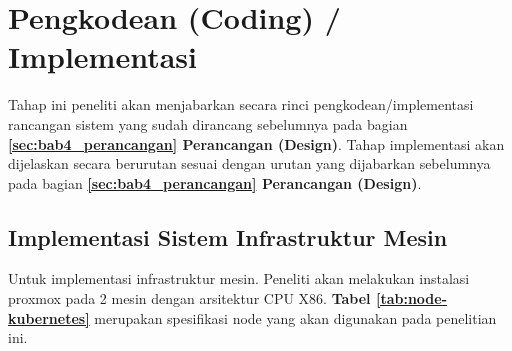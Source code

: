 \section{Pengkodean (Coding) / Implementasi}\label{sec:bab4_implementasi}
Tahap ini peneliti akan menjabarkan secara rinci pengkodean/implementasi
rancangan sistem yang sudah dirancang sebelumnya pada bagian
\textbf{\ref{sec:bab4_perancangan} Perancangan (Design)}. Tahap implementasi
akan dijelaskan secara berurutan sesuai dengan urutan yang dijabarkan
sebelumnya pada bagian \textbf{\ref{sec:bab4_perancangan} Perancangan
  (Design)}.

\subsection{Implementasi Sistem Infrastruktur Mesin}\label{sec:bab4_instalasi_infrastruktur_mesin}
Untuk implementasi infrastruktur mesin. Peneliti akan melakukan instalasi
proxmox pada 2 mesin dengan arsitektur CPU X86. \textbf{Tabel
  \ref{tab:node-kubernetes}} merupakan spesifikasi node yang akan digunakan pada
penelitian ini.

